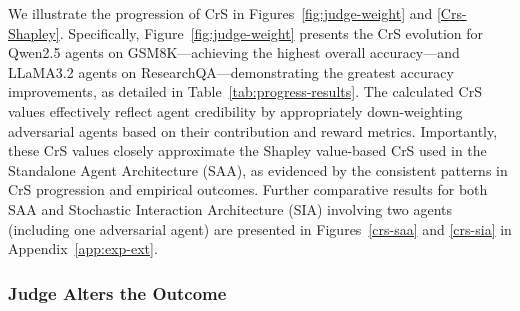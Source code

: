 We illustrate the progression of CrS in Figures~\ref{fig:judge-weight} and \ref{Crs-Shapley}. Specifically, Figure~\ref{fig:judge-weight} presents the CrS evolution for Qwen2.5 agents on GSM8K—achieving the highest overall accuracy—and LLaMA3.2 agents on ResearchQA—demonstrating the greatest accuracy improvements, as detailed in Table~\ref{tab:progress-results}. The calculated CrS values effectively reflect agent credibility by appropriately down-weighting adversarial agents based on their contribution and reward metrics. Importantly, these CrS values closely approximate the Shapley value-based CrS used in the Standalone Agent Architecture (SAA), as evidenced by the consistent patterns in CrS progression and empirical outcomes. Further comparative results for both SAA and Stochastic Interaction Architecture (SIA) involving two agents (including one adversarial agent) are presented in Figures~\ref{crs-saa} and \ref{crs-sia} in Appendix~\ref{app:exp-ext}.


\subsubsection{Judge Alters the Outcome}

\begin{table}[h!]
\centering
{}

\caption{Comparison of accuracies before and after communication on a sample of 50 questions from HumanEval dataset.}
\label{tab:humaneval_comp}
\vspace{-2mm}
\end{table}

